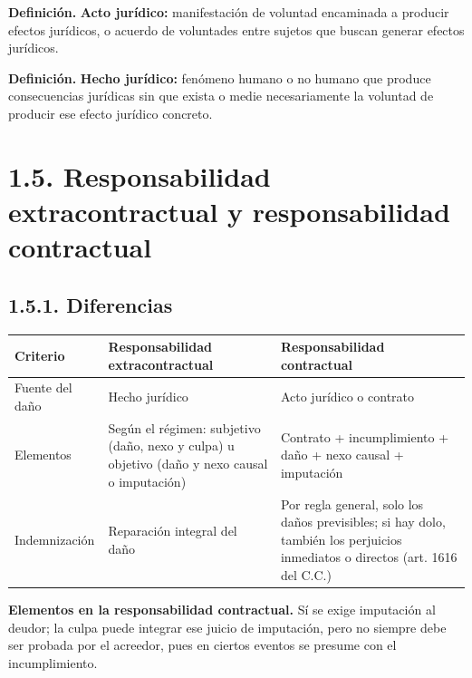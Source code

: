 \begin{definicion}
\textcolor[HTML]{1F3864}{\textbf{Definición. }}\textbf{Acto jurídico: }manifestación de voluntad encaminada a producir efectos jurídicos, o acuerdo de voluntades entre sujetos que buscan generar efectos jurídicos.
\par
\textcolor[HTML]{1F3864}{\textbf{Definición. }}\textbf{Hecho jurídico: }fenómeno humano o no humano que produce consecuencias jurídicas sin que exista o medie necesariamente la voluntad de producir ese efecto jurídico concreto.
\end{definicion}
\section{1.5. Responsabilidad extracontractual y responsabilidad contractual}
\subsection{1.5.1. Diferencias}
\begin{tabla}
\begin{longtable}{|>{\raggedright\arraybackslash}m{}|>{\raggedright\arraybackslash}m{}|>{\raggedright\arraybackslash}m{}|}
\hline
\cellcolor[HTML]{1F3864}\textcolor[HTML]{FFFFFF}{\textbf{Criterio}} & \cellcolor[HTML]{1F3864}\textcolor[HTML]{FFFFFF}{\textbf{Responsabilidad extracontractual}} & \cellcolor[HTML]{1F3864}\textcolor[HTML]{FFFFFF}{\textbf{Responsabilidad contractual}} \\ \hline
Fuente del daño & Hecho jurídico & Acto jurídico o contrato \\ \hline
\cellcolor[HTML]{F2F5FA}Elementos & \cellcolor[HTML]{F2F5FA}Según el régimen: subjetivo (daño, nexo y culpa) u objetivo (daño y nexo causal o imputación) & \cellcolor[HTML]{F2F5FA}Contrato + incumplimiento + daño + nexo causal + imputación \\ \hline
Indemnización & Reparación integral del daño & Por regla general, solo los daños previsibles; si hay dolo, también los perjuicios inmediatos o directos (art. 1616 del C.C.) \\ \hline
\end{longtable}
\end{tabla}
\textbf{Elementos en la responsabilidad contractual.} Sí se exige imputación al deudor; la culpa puede integrar ese juicio de imputación, pero no siempre debe ser probada por el acreedor, pues en ciertos eventos se presume con el incumplimiento.

